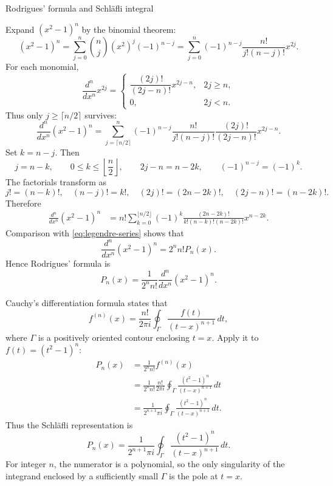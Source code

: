 \documentclass[11pt]{beamer}
\begin{document}
\begin{frame}[allowframebreaks]{Rodrigues' formula and Schl\"afli integral}
\footnotesize

Expand $(x^2-1)^n$ by the binomial theorem:
\begin{equation}
  (x^2-1)^n
   =\sum_{j=0}^{n}
      \binom{n}{j}(x^2)^j(-1)^{n-j}
   =\sum_{j=0}^{n}
      (-1)^{n-j}\frac{n!}{j!(n-j)!}x^{2j}.
  \label{eq:binom}
\end{equation}
For each monomial,
\[
  \frac{d^n}{dx^n}x^{2j}
  =
  \begin{cases}
    \dfrac{(2j)!}{(2j-n)!}x^{2j-n}, & 2j\ge n,\\[0.7em]
    0, & 2j<n.
  \end{cases}
\]
Thus only $j\ge\lceil n/2\rceil$ survives:
\[
  \frac{d^n}{dx^n}(x^2-1)^n
   =
    \sum_{j=\lceil n/2\rceil}^{n}
      (-1)^{n-j}
      \frac{n!}{j!(n-j)!}
      \frac{(2j)!}{(2j-n)!}x^{2j-n}.
\]
Set $k=n-j$.  Then
\[
  j=n-k,
  \qquad
  0\le k\le\left\lfloor\frac n2\right\rfloor,
  \qquad
  2j-n=n-2k,
  \qquad
  (-1)^{n-j}=(-1)^k.
\]
The factorials transform as
\[
  j!=(n-k)!,
  \quad
  (n-j)!=k!,
  \quad
  (2j)!=(2n-2k)!,
  \quad
  (2j-n)!=(n-2k)!.
\]
Therefore
\begin{align*}
  \frac{d^n}{dx^n}(x^2-1)^n
   &=
    n!\sum_{k=0}^{\lfloor n/2\rfloor}
      (-1)^k
      \frac{(2n-2k)!}
           {k!(n-k)!(n-2k)!}
      x^{n-2k}.
\end{align*}
Comparison with \eqref{eq:legendre-series} shows that
\[
  \frac{d^n}{dx^n}(x^2-1)^n=2^n n!P_n(x).
\]
Hence Rodrigues' formula is
\begin{equation}
  P_n(x)
   =\frac{1}{2^n n!}
      \frac{d^n}{dx^n}(x^2-1)^n.
  \label{eq:rodrigues-legendre}
\end{equation}

Cauchy's differentiation formula states that
\[
  f^{(n)}(x)
    =\frac{n!}{2\pi i}
      \oint_\Gamma\frac{f(t)}{(t-x)^{n+1}}\,dt,
\]
where $\Gamma$ is a positively oriented contour enclosing $t=x$.  Apply it to
$f(t)=(t^2-1)^n$:
\begin{align*}
  P_n(x)
   &=
    \frac{1}{2^n n!}f^{(n)}(x)\\
   &=
    \frac{1}{2^n n!}
    \frac{n!}{2\pi i}
    \oint_\Gamma
      \frac{(t^2-1)^n}{(t-x)^{n+1}}\,dt\\
   &=
    \frac{1}{2^{n+1}\pi i}
    \oint_\Gamma
      \frac{(t^2-1)^n}{(t-x)^{n+1}}\,dt.
\end{align*}
Thus the Schl\"afli representation is
\begin{equation}
  P_n(x)
    =\frac{1}{2^{n+1}\pi i}
      \oint_\Gamma
      \frac{(t^2-1)^n}{(t-x)^{n+1}}\,dt.
  \label{eq:schlafli-legendre}
\end{equation}
For integer $n$, the numerator is a polynomial, so the only singularity of the
integrand enclosed by a sufficiently small $\Gamma$ is the pole at $t=x$.
\end{frame}
\end{document}

